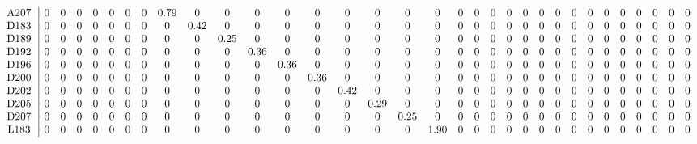 \begin{table}[H]
\begin{center}
\begin{math}
\begin{array}{c|cccccccccccccccccccccccccccccccc}
\mathrm{A207} \hspace*{2pt} &  0 &  0 &  0 &  0 &  0 &  0 &  0 &       0.79 &  0 &  0 &  0 &  0 &  0 &  0 &  0 &  0 &  0 &  0 &  0 &  0 &  0 &  0 &  0 &  0 &  0 &  0 &  0 &  0 &  0 &  0 &  0 &  0 \\
\mathrm{D183} \hspace*{2pt} &  0 &  0 &  0 &  0 &  0 &  0 &  0 &  0 &       0.42 &  0 &  0 &  0 &  0 &  0 &  0 &  0 &  0 &  0 &  0 &  0 &  0 &  0 &  0 &  0 &  0 &  0 &  0 &  0 &  0 &  0 &  0 &  0 \\
\mathrm{D189} \hspace*{2pt} &  0 &  0 &  0 &  0 &  0 &  0 &  0 &  0 &  0 &       0.25 &  0 &  0 &  0 &  0 &  0 &  0 &  0 &  0 &  0 &  0 &  0 &  0 &  0 &  0 &  0 &  0 &  0 &  0 &  0 &  0 &  0 &  0 \\
\mathrm{D192} \hspace*{2pt} &  0 &  0 &  0 &  0 &  0 &  0 &  0 &  0 &  0 &  0 &       0.36 &  0 &  0 &  0 &  0 &  0 &  0 &  0 &  0 &  0 &  0 &  0 &  0 &  0 &  0 &  0 &  0 &  0 &  0 &  0 &  0 &  0 \\
\mathrm{D196} \hspace*{2pt} &  0 &  0 &  0 &  0 &  0 &  0 &  0 &  0 &  0 &  0 &  0 &       0.36 &  0 &  0 &  0 &  0 &  0 &  0 &  0 &  0 &  0 &  0 &  0 &  0 &  0 &  0 &  0 &  0 &  0 &  0 &  0 &  0 \\
\mathrm{D200} \hspace*{2pt} &  0 &  0 &  0 &  0 &  0 &  0 &  0 &  0 &  0 &  0 &  0 &  0 &       0.36 &  0 &  0 &  0 &  0 &  0 &  0 &  0 &  0 &  0 &  0 &  0 &  0 &  0 &  0 &  0 &  0 &  0 &  0 &  0 \\
\mathrm{D202} \hspace*{2pt} &  0 &  0 &  0 &  0 &  0 &  0 &  0 &  0 &  0 &  0 &  0 &  0 &  0 &       0.42 &  0 &  0 &  0 &  0 &  0 &  0 &  0 &  0 &  0 &  0 &  0 &  0 &  0 &  0 &  0 &  0 &  0 &  0 \\
\mathrm{D205} \hspace*{2pt} &  0 &  0 &  0 &  0 &  0 &  0 &  0 &  0 &  0 &  0 &  0 &  0 &  0 &  0 &       0.29 &  0 &  0 &  0 &  0 &  0 &  0 &  0 &  0 &  0 &  0 &  0 &  0 &  0 &  0 &  0 &  0 &  0 \\
\mathrm{D207} \hspace*{2pt} &  0 &  0 &  0 &  0 &  0 &  0 &  0 &  0 &  0 &  0 &  0 &  0 &  0 &  0 &  0 &       0.25 &  0 &  0 &  0 &  0 &  0 &  0 &  0 &  0 &  0 &  0 &  0 &  0 &  0 &  0 &  0 &  0 \\
\mathrm{L183} \hspace*{2pt} &  0 &  0 &  0 &  0 &  0 &  0 &  0 &  0 &  0 &  0 &  0 &  0 &  0 &  0 &  0 &  0 &       1.90 &  0 &  0 &  0 &  0 &  0 &  0 &  0 &  0 &  0 &  0 &  0 &  0 &  0 &  0 &  0 \\

\end{array}
\end{math}
\end{center}
\end{table}
